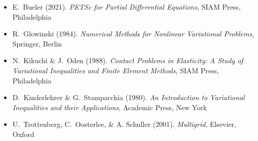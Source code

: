
\newcommand{\sdoi}[1]{\,{\tiny \href{https://doi.org/#1}{doi:#1}}}
\begin{itemize}
\item E.~Bueler (2021). \emph{PETSc for Partial Differential Equations}, SIAM Press, Philadelphia
\item R.~Glowinski (1984). \emph{Numerical Methods for Nonlinear Variational Problems}, Springer, Berlin
\item N.~Kikuchi \& J.~Oden (1988).  \emph{Contact Problems in Elasticity: A Study of Variational Inequalities and Finite Element Methods}, SIAM Press, Philadelphia
\item D.~Kinderlehrer \& G.~Stampacchia (1980). \emph{An Introduction to Variational Inequalities and their Applications}, Academic Press, New York
\item U.~Trottenberg, C.~Oosterlee, \& A. Schuller (2001).  \emph{Multigrid}, Elsevier, Oxford
\end{itemize}

